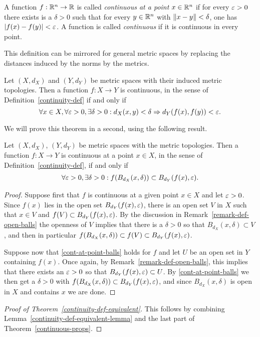 \begin{defn}
  A function $f : \mathbb{R}^n \to \mathbb{R}$ is called \emph{continuous at a point} $x \in \mathbb{R}^n$ if for every $\varepsilon > 0$ there exists is a $\delta > 0$ such that for every $y \in \mathbb{R}^n$ with $\lVert x-y \rVert < \delta$, one has $\lvert f(x)-f(y) \rvert < \varepsilon$. A function is called \emph{continuous} if it is continuous in every point.
\end{defn}
This definition can be mirrored for general metric spaces by replacing the distances induced by the norms by the metrics.
\begin{thm}
  \label{continuity-def-equivalent}
  Let $(X,d_X)$ and $(Y,d_Y)$ be metric spaces with their induced metric topologies. Then a function $f : X \to Y$ is continuous, in the sense of Definition~\ref{continuity-def} if and only if
  \[
    \forall x \in X, \forall \varepsilon > 0, \exists \delta > 0 : d_X(x,y) < \delta \Rightarrow d_Y(f(x),f(y)) < \varepsilon.
  \]
\end{thm}
We will prove this theorem in a second, using the following result.
\begin{lem}
  \label{continuity-def-equivalent-lemma}
  Let $(X,d_X)$, $(Y,d_Y)$ be metric spaces with the metric topologies. Then a function $f : X \to Y$ is continuous at a point $x \in X$, in the sense of Definition~\ref{continuity-def}, if and only if
  \begin{align}
    \label{cont-at-point-balls}
    \forall \varepsilon > 0, \exists \delta > 0 : f(B_{d_X}(x,\delta)) \subset B_{d_Y}(f(x),\varepsilon).
  \end{align}
\end{lem}
\begin{proof}
  Suppose first that $f$ is continuous at a given point $x \in X$ and let $\varepsilon > 0$. Since $f(x)$ lies in the open set $B_{d_Y}(f(x),\varepsilon)$, there is an open set $V$ in $X$ such that $x \in V$ and $f(V) \subset B_{d_Y}(f(x),\varepsilon)$. By the discussion in Remark~\ref{remark-def-open-balls} the openness of $V$ implies that there is a $\delta > 0$ so that $B_{d_X}(x,\delta) \subset V$, and then in particular $f(B_{d_X}(x,\delta)) \subset f(V) \subset B_{d_Y}(f(x),\varepsilon)$.
  
  Suppose now that \eqref{cont-at-point-balls} holds for $f$ and let $U$ be an open set in $Y$ containing $f(x)$. Once again, by Remark~\ref{remark-def-open-balls}, this implies that there exists an $\varepsilon > 0$ so that $B_{d_Y}(f(x),\varepsilon) \subset U$. By \eqref{cont-at-point-balls} we then get a $\delta > 0$ with $f(B_{d_X}(x,\delta)) \subset B_{d_Y}(f(x),\varepsilon)$, and since $B_{d_X}(x,\delta)$ is open in $X$ and contains $x$ we are done.
\end{proof}
\begin{proof}[Proof of Theorem~\ref{continuity-def-equivalent}]
  This follows by combining Lemma~\ref{continuity-def-equivalent-lemma} and the last part of Theorem~\ref{continuous-props}.
\end{proof}


